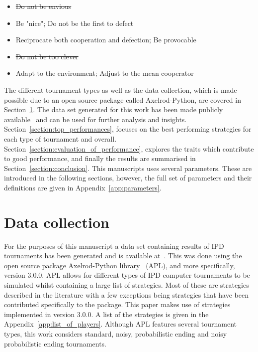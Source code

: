 \documentclass{article}
\newcommand{\numberofstrategies}{}
\begin{document}
\begin{itemize}
    \item \st{Do not be envious}
    \item Be "nice"; Do not be the first to defect
    \item Reciprocate both cooperation and defection; Be provocable
    \item \st{Do not be too clever}
    \item Adapt to the environment; Adjust to the mean cooperator
\end{itemize}

The different tournament types as well as the data collection, which is made
possible due to an open source package called Axelrod-Python,
are covered in Section~\ref{section:data_collection}. The data set generated
for this work has been made publicly available~\cite{data} and can be used
for further analysis and insights.
Section~\ref{section:top_performances}, focuses on the best performing
strategies for each type of tournament and overall.
Section~\ref{section:evaluation_of_performance}, explores the traits which
contribute to good performance, and finally the results are summarised in
Section~\ref{section:conclusion}. This manuscripts uses several parameters.
These are introduced in the following sections, however, the full set of
parameters and their definitions are given in Appendix~\ref{app:parameters}.

\section{Data collection}\label{section:data_collection}

For the purposes of this manuscript a data set containing results of IPD
tournaments has been generated and is available at~\cite{data}. This was done using the
open source package Axelrod-Python library~\cite{axelrodproject} (APL), and more specifically,
version 3.0.0. APL allows for different types of IPD computer
tournaments to be simulated whilst containing a large list of strategies.
Most of these are strategies described in the literature with a few exceptions
being strategies that have been contributed specifically to the package. This
paper makes use of \numberofstrategies strategies implemented in version 3.0.0. A
list of the strategies is given in the Appendix~\ref{app:list_of_players}.
Although APL features several tournament types, this work considers
standard, noisy, probabilistic ending and noisy probabilistic ending
tournaments.
\end{document}
